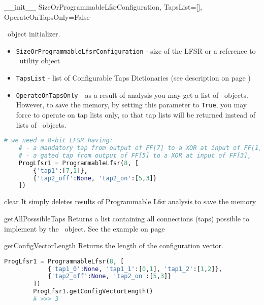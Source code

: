  {\_\_init\_\_} {SizeOrProgrammableLfsrConfiguration, TapsList=[],\\OperateOnTapsOnly=False} {
	\ProgrammableLfsr\ object initializer.
	\begin{itemize}
		\item \texttt{SizeOrProgrammableLfsrConfiguration} - size of the LFSR or a reference to \ProgrammableLfsrConfig\ utility object
		\item \texttt{TapsList} - list of Configurable Taps Dictionaries (see description on page \pageref{configurabletapsdictionary})
		\item \texttt{OperateOnTapsOnly} - as a result of analysis you may get a list of \Lfsr\ objects. However, to save the memory, by setting this parameter to \texttt{True}, you may force to operate on tap lists only, so that tap lists will be returned instead of lists of \Lfsr\ objects.
	\end{itemize}
}
\begin{lstlisting}[language=Python]
	# we need a 8-bit LFSR having:
	# - a mandatory tap from output of FF[7] to a XOR at input of FF[1],
	# - a gated tap from output of FF[5] to a XOR at input of FF[3], 
	ProgLfsr1 = ProgrammableLfsr(8, [
		{'tap1':[7,1]},
		{'tap2_off':None, 'tap2_on':[5,3]}
	])
\end{lstlisting}

 {clear} {} {
	It simply deletes results of Programmable Lfsr analysis to save the memory
}

 {getAllPosssibleTaps} {} {
	Returns a list containing all connections (taps) possible to implement by the \ProgrammableLfsr\ object. 
	See the example on page \pageref{programmablelfsrexample}
}

 {getConfigVectorLength} {} {
	Returns the length of the configuration vector.
}\begin{lstlisting}[language=Python]
		ProgLfsr1 = ProgrammableLfsr(8, [
			{'tap1_0':None, 'tap1_1':[0,1], 'tap1_2':[1,2]},
			{'tap2_off':None, 'tap2_on':[5,3]}
		])
		ProgLfsr1.getConfigVectorLength()
		# >>> 3
\end{lstlisting}

